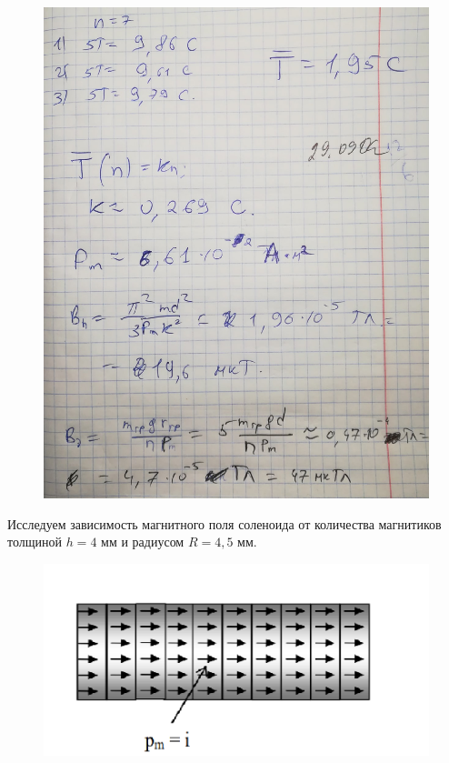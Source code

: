 \documentclass[a4paper,12pt]{article} %
\begin{document}
\newpage
\begin{figure}[h!]
	\centering
	\includegraphics[scale=0.32]{sign.jpg}
\end{figure}
Исследуем зависимость магнитного поля соленоида от количества магнитиков толщиной $h = 4$ мм и радиусом $R = 4,5$ мм.

\begin{figure}[h!]
	\centering
	\includegraphics[scale=0.7]{Цил.png}
\end{figure}
\end{document}
